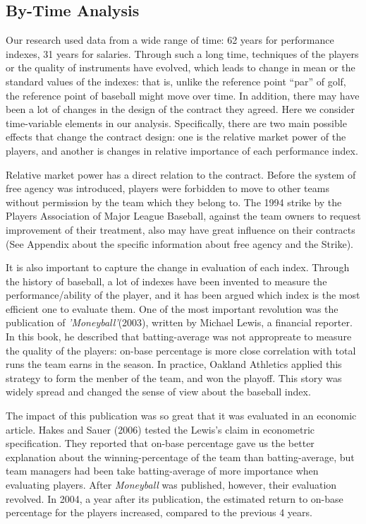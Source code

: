 \documentclass[dvipdfmx, 12pt]{article}
\begin{document}
\subsection{By-Time Analysis}

Our research used data from a wide range of time: 62 years for performance indexes, 31 years for salaries. Through such a long time, techniques of the players or the quality of instruments have evolved, which leads to change in mean or the standard values of the indexes: that is, unlike the reference point ``par'' of golf, the reference point of baseball might move over time. In addition, there may have been a lot of changes in the design of the contract they agreed. Here we consider time-variable elements in our analysis. Specifically, there are two main possible effects that change the contract design: one is the relative market power of the players, and another is changes in relative importance of each performance index.

Relative market power has a direct relation to the contract. Before the system of free agency was introduced, players were forbidden to move to other teams without permission by the team which they belong to. The 1994 strike by the Players Association of Major League Baseball, against the team owners to request improvement of their treatment, also may have great influence on their contracts (See Appendix about the specific information about free agency and the Strike).

It is also important to capture the change in evaluation of each index. Through the history of baseball, a lot of indexes have been invented to measure the performance/ability of the player, and it has been argued which index is the most efficient one to evaluate them. One of the most important revolution was the publication of \textit{'Moneyball'}(2003), written by Michael Lewis, a financial reporter. In this book, he described that batting-average was not appropreate to measure the quality of the players: on-base percentage is more close correlation with total runs the team earns in the season. In practice, Oakland Athletics applied this strategy to form the menber of the team, and won the playoff. This story was widely spread and changed the sense of view about the baseball index.

The impact of this publication was so great that it was evaluated in an economic article. Hakes and Sauer (2006) tested the Lewis's claim in econometric specification. They reported that on-base percentage gave us the better explanation about the winning-percentage of the team than batting-average, but team managers had been take batting-average of more importance when evaluating players. After \textit{Moneyball} was published, however, their evaluation revolved. In 2004, a year after its publication, the estimated return to on-base percentage for the players increased, compared to the previous 4 years.
\end{document}
